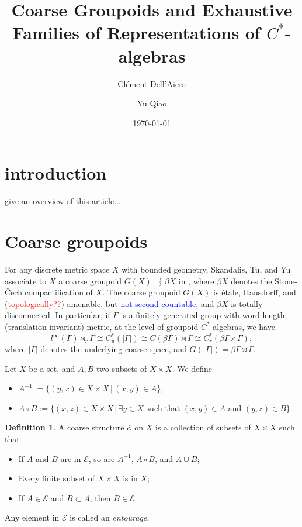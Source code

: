 \documentclass[a4paper]{amsart}
\author[C. Dell'Aiera]{Cl\'ement Dell'Aiera}
\author[Yu Qiao]{Yu Qiao}
\date{\today}
\title[Coarse groupoids and exhaustive families]{Coarse Groupoids and Exhaustive Families of Representations of $C^*$-algebras}
\newcommand\blue[1]{\textcolor{blue}{#1}}
\newcommand\red[1]{\textcolor{red}{#1}}
\newcommand{\tto}{\rightrightarrows}
\newcommand{\maE}{\mathcal E}
\newcommand\<{\langle}
\renewcommand\>{\rangle}
\theoremstyle{definition}
\newtheorem{defn}[theorem]{Definition}
\theoremstyle{remark}
\begin{document}
\maketitle

\begin{abstract}

\end{abstract}



\section{introduction}\label{intro}
give an overview of this article....


\bigskip

\section{Coarse groupoids}

For any discrete metric space $X$ with bounded geometry, Skandalis, Tu, and Yu associate to $X$ a coarse groupoid
$G(X)\tto \beta X$ in \cite{STY}, where $\beta X$ denotes the Stone-\v{C}ech compactification of $X$. The coarse groupoid $G(X)$ is \'etale, Hausdorff, and (\red{topologically??}) amenable, but \blue{not second countable}, and $\beta X$ is totally disconnected.
In particular, if $\Gamma$ is a finitely generated group with word-length (translation-invariant) metric,
at the level of groupoid $C^*$-algebras, we have
\begin{equation*}
l^{\infty}(\Gamma) \rtimes_r \Gamma \cong C_u^*(|\Gamma|)\cong C(\beta \Gamma) \rtimes \Gamma\cong C_r^*(\beta\Gamma \rtimes \Gamma),
\end{equation*}
where $|\Gamma|$ denotes the underlying coarse space, and $G(|\Gamma|)=\beta\Gamma \rtimes \Gamma$.

Let $X$ be a set, and $A, B$ two subsets of $X \times X$. We define
\begin{itemize}
\item $A^{-1}:=\{(y,x) \in X\times X\,| \, (x,y) \in A\}$,
\item $A \circ B:= \{(x,z) \in X \times X \, | \, \exists y \in X \,\,\text{such that} \,\, (x,y) \in A \,\, \text{and} \,\, (y,z) \in B \}$.
\end{itemize}

\begin{defn}
A coarse structure $\maE$ on $X$ is a collection of subsets of $X \times X$ such that
\begin{itemize}
\item If $A$ and $B$ are in $\maE$, so are $A^{-1}$, $A\circ B$, and $A \cup B$;
\item Every finite subset of $X \times X$ is in $X$;
\item If $A \in \maE$ and $B \subset A$, then $B \in \maE$.
\end{itemize}
Any element in $\maE$ is called an {\em entourage}.
\end{defn}
\end{document}
